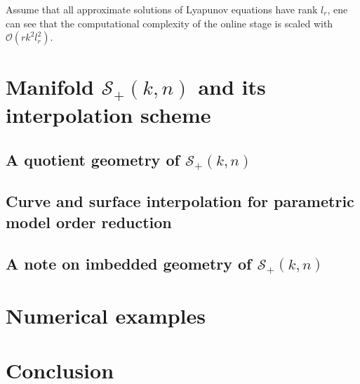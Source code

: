 Assume that all approximate solutions of Lyapunov equations have rank $l_r$, ene can see that the computational complexity of the online stage is scaled with $\mathcal{O}(rk^2l_r^2)$.









\section{Manifold $\mathcal{S}_+(k,n)$ and its interpolation scheme}\label{Sec:Manifold}
\subsection{A quotient geometry of $\mathcal{S}_+(k,n)$}
\subsection{Curve and surface interpolation for parametric model order reduction}
\subsection{A note on imbedded geometry of $\mathcal{S}_+(k,n)$}

\section{Numerical examples}\label{Sec:NumerExam}


\section{Conclusion}\label{Sec:Concl}





%
%




